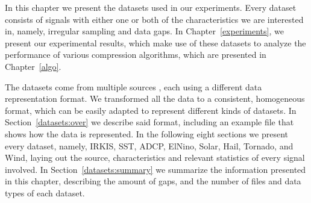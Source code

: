






\newcommand{\dataCite}{\cite{dataset:irkis, dataset:irkis2, dataset:sst1, dataset:elnino, dataset:solar, dataset:spc}}

In this chapter we present the datasets used in our experiments. Every dataset consists of signals with either one or both of the characteristics we are interested in, namely, irregular sampling and data gaps. In Chapter~\ref{experiments}, we present our experimental results, which make use of these datasets to analyze the performance of various compression algorithms, which are presented in Chapter~\ref{algo}.


The datasets come from multiple sources \dataCite, each using a different data representation format. We transformed all the data to a consistent, homogeneous format, which can be easily adapted to represent different kinds of datasets. In Section~\ref{datasets:over} we describe said format, including an example file that shows how the data is represented. In the following eight sections we present every dataset, namely, IRKIS, SST, ADCP, ElNino, Solar, Hail, Tornado, and Wind, laying out the source, characteristics and relevant statistics of every signal involved. In Section~\ref{datasets:summary} we summarize the information presented in this chapter, describing the amount of gaps, and the number of files and data types of each dataset. 

